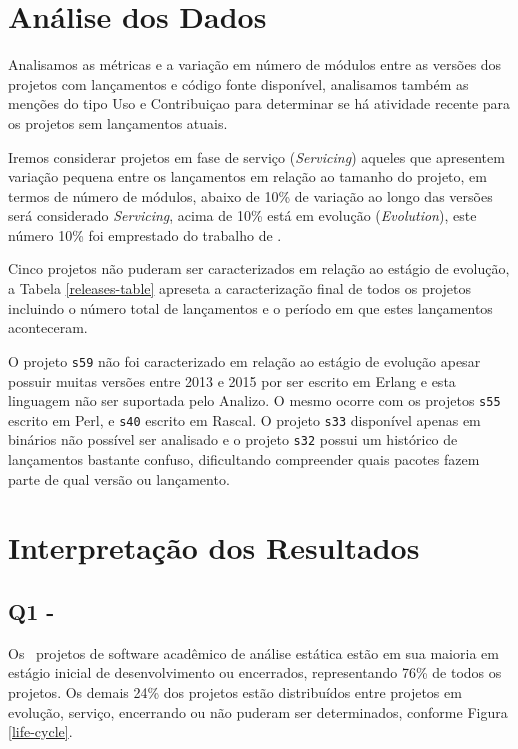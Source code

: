 
\section{Análise dos Dados} \label{estudo3:analise} %

Analisamos as métricas e a variação em número de módulos entre as versões dos
projetos com lançamentos e código fonte disponível, analisamos também as
menções do tipo Uso e Contribuiçao para determinar se há atividade recente para
os projetos sem lançamentos atuais.

Iremos considerar projetos em fase de serviço ({\it Servicing}) aqueles que
apresentem variação pequena entre os lançamentos em relação ao tamanho do
projeto, em termos de número de módulos, abaixo de 10\% de variação ao longo
das versões será considerado {\it Servicing}, acima de 10\% está em evolução
({\it Evolution}), este número 10\% foi emprestado do trabalho de
.

Cinco projetos não puderam ser caracterizados em relação ao estágio de
evolução, a Tabela \ref{releases-table} apreseta a caracterização final de
todos os projetos incluindo o número total de lançamentos e o período em que
estes lançamentos aconteceram.



O projeto \texttt{s59} não foi caracterizado em relação ao estágio de evolução
apesar possuir muitas versões entre 2013 e 2015 por ser escrito em Erlang e
esta linguagem não ser suportada pelo Analizo. O mesmo ocorre com os projetos
\texttt{s55} escrito em Perl, e \texttt{s40} escrito em Rascal.  O projeto
\texttt{s33} disponível apenas em binários não possível ser analisado e o
projeto \texttt{s32} possui um histórico de lançamentos bastante confuso,
dificultando compreender quais pacotes fazem parte de qual versão ou
lançamento.


\section{Interpretação dos Resultados} \label{estudo3:interpretacao} %

\subsection{Q1 - \EstudoTresQuestaoUm}

Os \SoftwareCount \ projetos de software acadêmico de análise estática estão em
sua maioria em estágio inicial de desenvolvimento ou encerrados, representando
76\% de todos os projetos. Os demais 24\% dos projetos estão distribuídos entre
projetos em evolução, serviço, encerrando ou não puderam ser determinados,
conforme Figura \ref{life-cycle}.

